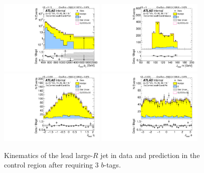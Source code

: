 \clearpage

\begin{figure}[htbp!]
\begin{center}
\includegraphics[width=0.45\textwidth,angle=-90]{figures/boosted/Control/b77_ThreeTag_Control_leadHCand_Pt_m_1.pdf}
\includegraphics[width=0.45\textwidth,angle=-90]{figures/boosted/Control/b77_ThreeTag_Control_leadHCand_Mass_s.pdf}\\
\includegraphics[width=0.45\textwidth,angle=-90]{figures/boosted/Control/b77_ThreeTag_Control_leadHCand_Eta.pdf}
\includegraphics[width=0.45\textwidth,angle=-90]{figures/boosted/Control/b77_ThreeTag_Control_leadHCand_Phi.pdf}
  \caption{Kinematics of the lead large-$R$ jet in data and prediction in the control region after requiring 3 $b$-tags. }
  \label{fig:boosted-3b-control-ak10-lead}
\end{center}
\end{figure}

